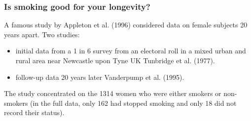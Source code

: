 \documentclass[a4paper]{article}\usepackage[]{graphicx}\usepackage[]{xcolor}
\begin{document}
\subsubsection{Is smoking good for your longevity?}
A famous study by Appleton et al. (1996) considered data on female subjects 20 years apart. Two studies:
\begin{itemize}
	\item initial data from a 1 in 6 survey from an electoral roll in a mixed urban and rural area near Newcastle upon Tyne UK Tunbridge et al. (1977).
	\item follow-up data 20 years later Vanderpump et al. (1995).
\end{itemize}
The study concentrated on the 1314 women who were either smokers or non- smokers (in the full data, only 162 had stopped smoking and only 18 did not record their status).
\end{document}
